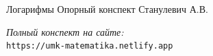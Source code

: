 \documentclass{umk-matematika}
\begin{document}
\maketitlepage
    {Логарифмы}
    {Опорный конспект}
    {Станулевич А.В.}

\begin{center}
\vspace{1.5cm}
\textit{Полный конспект на сайте:}\\
\texttt{https://umk-matematika.netlify.app}
\end{center}
\end{document}
